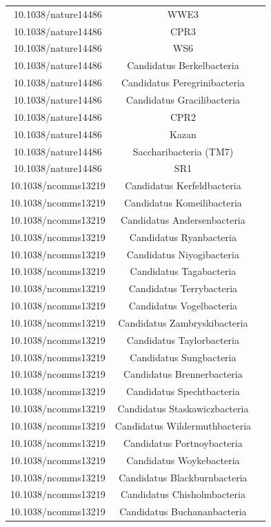 \documentclass[12pt, a4paper]{report}
\begin{document}
\begin{center}
\begin{longtable}{ccc}
10.1038/nature14486	&	WWE3	\\
10.1038/nature14486	&	CPR3	\\
10.1038/nature14486	&	WS6	\\
10.1038/nature14486	&	Candidatus Berkelbacteria	\\
10.1038/nature14486	&	Candidatus Peregrinibacteria	\\
10.1038/nature14486	&	Candidatus Gracilibacteria	\\
10.1038/nature14486	&	CPR2	\\
10.1038/nature14486	&	Kazan	\\
10.1038/nature14486	&	Saccharibacteria (TM7)	\\
10.1038/nature14486	&	SR1	\\
10.1038/ncomms13219	&	Candidatus Kerfeldbacteria 	\\
10.1038/ncomms13219	&	Candidatus Komeilibacteria	\\
10.1038/ncomms13219	&	Candidatus Andersenbacteria 	\\
10.1038/ncomms13219	&	Candidatus Ryanbacteria	\\
10.1038/ncomms13219	&	Candidatus Niyogibacteria 	\\
10.1038/ncomms13219	&	Candidatus Tagabacteria 	\\
10.1038/ncomms13219	&	Candidatus Terrybacteria 	\\
10.1038/ncomms13219	&	Candidatus Vogelbacteria	\\
10.1038/ncomms13219	&	Candidatus Zambryskibacteria 	\\
10.1038/ncomms13219	&	Candidatus Taylorbacteria	\\
10.1038/ncomms13219	&	Candidatus Sungbacteria	\\
10.1038/ncomms13219	&	Candidatus Brennerbacteria 	\\
10.1038/ncomms13219	&	Candidatus Spechtbacteria 	\\
10.1038/ncomms13219	&	Candidatus Staskawiczbacteria 	\\
10.1038/ncomms13219	&	Candidatus Wildermuthbacteria	\\
10.1038/ncomms13219	&	Candidatus Portnoybacteria 	\\
10.1038/ncomms13219	&	 Candidatus Woykebacteria 	\\
10.1038/ncomms13219	&	Candidatus Blackburnbacteria 	\\
10.1038/ncomms13219	&	Candidatus Chisholmbacteria 	\\
10.1038/ncomms13219	&	Candidatus Buchananbacteria	\\

\end{longtable}
\end{center}
\end{document}
